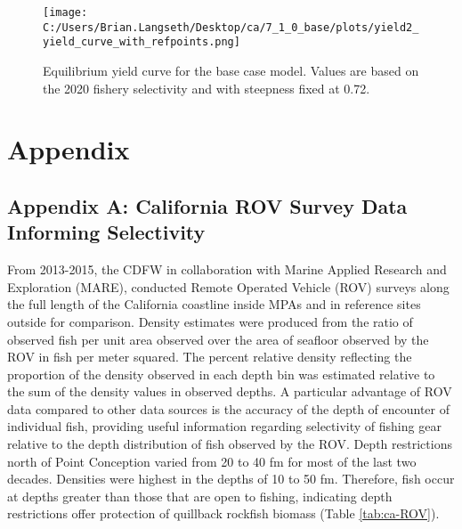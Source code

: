 \documentclass[11pt,
  english,
  a4paper,
]{article}
\begin{document}
\tagmcend\tagstructend


\begin{figure}
\centering
\texttt{[image: C:/Users/Brian.Langseth/Desktop/ca/7\_1\_0\_base/plots/yield2\_yield\_curve\_with\_refpoints.png]}
\caption{Equilibrium yield curve for the base case model. Values are based on the 2020 fishery selectivity and with steepness fixed at 0.72.\label{fig:yield}}
\end{figure}

\tagmcend\tagstructend

\newpage

\clearpage


\hypertarget{appendix}{%
\section{Appendix}\label{appendix}}

\leavevmode\tagmcend\tagstructend


\hypertarget{append_a}{%
\subsection{Appendix A: California ROV Survey Data Informing Selectivity}\label{append_a}}

\leavevmode\tagmcend\tagstructend


From 2013-2015, the CDFW in collaboration with Marine Applied Research and Exploration (MARE), conducted Remote Operated Vehicle (ROV) surveys along the full length of the California coastline inside MPAs and in reference sites outside for comparison. Density estimates were produced from the ratio of observed fish per unit area observed over the area of seafloor observed by the ROV in fish per meter squared. The percent relative density reflecting the proportion of the density observed in each depth bin was estimated relative to the sum of the density values in observed depths. A particular advantage of ROV data compared to other data sources is the accuracy of the depth of encounter of individual fish, providing useful information regarding selectivity of fishing gear relative to the depth distribution of fish observed by the ROV. Depth restrictions north of Point Conception varied from 20 to 40 fm for most of the last two decades. Densities were highest in the depths of 10 to 50 fm. Therefore, fish occur at depths greater than those that are open to fishing, indicating depth restrictions offer protection of quillback rockfish biomass (Table \ref{tab:ca-ROV}).
\end{document}
